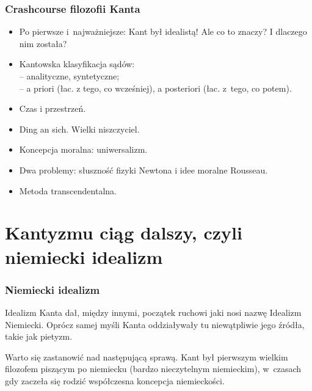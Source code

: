 \documentclass[10pt,t]{beamer}
\begin{document}
\begin{frame}
  \frametitle{Crashcourse filozofii Kanta}


  \begin{itemize}
    \RaggedRight

  \item Po pierwsze i~najważniejsze: Kant był idealistą! Ale co to
    znaczy? I dlaczego nim została?

  \item Kantowska klasyfikacja sądów: \\
    -- analityczne, syntetyczne; \\
    -- a priori (łac. z tego, co wcześniej), a posteriori (łac.
    z~tego, co potem).

  \item Czas i przestrzeń.

  \item Ding an sich. Wielki niszczyciel.

  \item Koncepcja moralna: uniwersalizm.

  \item Dwa problemy: słuszność fizyki Newtona i idee moralne
    Rousseau.

  \item Metoda transcendentalna.

  \end{itemize}

\end{frame}










\section{Kantyzmu ciąg dalszy, czyli niemiecki idealizm}



\begin{frame}
  \frametitle{Niemiecki idealizm}


  Idealizm Kanta dał, między innymi, początek ruchowi jaki nosi
  nazwę Idealizm Niemiecki. Oprócz samej myśli Kanta oddziaływały tu
  niewątpliwie jego źródła, takie jak pietyzm.

  Warto się zastanowić nad następującą sprawą. Kant był pierwszym
  wielkim filozofem piszącym po niemiecku (bardzo nieczytelnym
  niemieckim), w~czasach gdy zaczeła się rodzić współczesna
  koncepcja niemieckości.

\end{frame}
\end{document}

